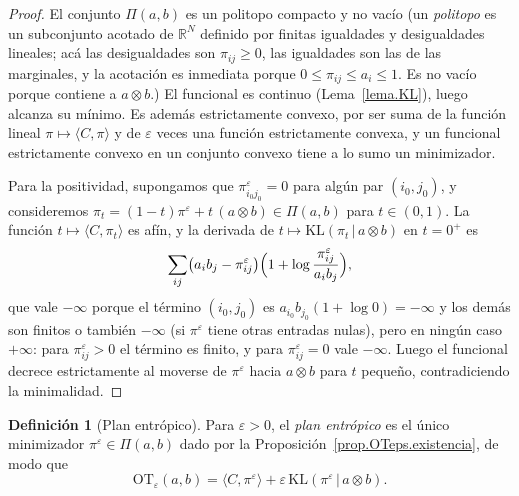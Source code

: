 \documentclass[12pt, a4paper]{amsbook}
\newcommand{\R}{{\mathbb R}}
\theoremstyle{remark}
\theoremstyle{definition}
\newtheorem{defi}[teo]{Definición}
\numberwithin{section}{chapter}
\numberwithin{subsection}{section}
\numberwithin{equation}{section}
\numberwithin{figure}{chapter}
\begin{document}
\begin{proof}
El conjunto $\Pi(a,b)$ es un politopo compacto y no vacío (un \emph{politopo}
es un subconjunto acotado de $\R^N$ definido por finitas igualdades y
desigualdades lineales; acá las desigualdades son $\pi_{ij}\ge0$, las
igualdades son las de las marginales, y la acotación es inmediata porque
$0\le\pi_{ij}\le a_i\le1$. Es no vacío porque contiene a
$a\otimes b$.) El funcional es continuo (Lema~\ref{lema.KL}), luego alcanza
su mínimo. Es además estrictamente convexo, por ser suma de la función lineal
$\pi\mapsto\langle C,\pi\rangle$ y de $\varepsilon$ veces una función
estrictamente convexa, y un funcional estrictamente convexo en un conjunto
convexo tiene a lo sumo un minimizador.

Para la positividad, supongamos que $\pi^\varepsilon_{i_0j_0}=0$ para algún
par $(i_0,j_0)$, y consideremos $\pi_t=(1-t)\pi^\varepsilon+t\,(a\otimes b)\in\Pi(a,b)$
para $t\in(0,1)$. La función $t\mapsto\langle C,\pi_t\rangle$ es afín, y la
derivada de $t\mapsto\mathrm{KL}(\pi_t\,|\,a\otimes b)$ en $t=0^+$ es
\[
\sum_{ij}\bigl(a_ib_j-\pi^\varepsilon_{ij}\bigr)\Bigl(1+\log\frac{\pi^\varepsilon_{ij}}{a_ib_j}\Bigr),
\]
que vale $-\infty$ porque el término $(i_0,j_0)$ es
$a_{i_0}b_{j_0}(1+\log0)=-\infty$ y los demás son finitos o también
$-\infty$ (si $\pi^\varepsilon$ tiene otras entradas nulas), pero en ningún
caso $+\infty$: para $\pi^\varepsilon_{ij}>0$ el término es finito, y para
$\pi^\varepsilon_{ij}=0$ vale $-\infty$. Luego el funcional decrece estrictamente al moverse
de $\pi^\varepsilon$ hacia $a\otimes b$ para $t$ pequeño, contradiciendo la
minimalidad.
\end{proof}

\begin{defi}[Plan entrópico]\label{def.plan.entropico}
Para $\varepsilon>0$, el \emph{plan entrópico} es el único minimizador
$\pi^\varepsilon\in\Pi(a,b)$ dado por la
Proposición~\ref{prop.OTeps.existencia}, de modo que
\[
\mathrm{OT}_\varepsilon(a,b)=\langle C,\pi^\varepsilon\rangle
+\varepsilon\,\mathrm{KL}(\pi^\varepsilon\,|\,a\otimes b).
\]
\end{defi}
\end{document}
